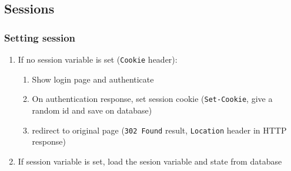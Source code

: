 \documentclass[trans,compress,xcolor=table]{beamer}
\begin{document}
\subsection{Sessions}
\begin{frame}[fragile]
\frametitle{Setting session}
\begin{enumerate}
\item If no session variable is set (\lstinline!Cookie! header):
\begin{enumerate}
	\item Show login page and authenticate
	\item On authentication response, set session cookie
			(\lstinline!Set-Cookie!, give a random id and save on database)
	\item redirect to original page (\lstinline!302 Found! result, \lstinline!Location! header in HTTP response)
\end{enumerate}
\item If session variable is set, load the sesion variable and state
	from database
\end{enumerate}
\end{frame}
\end{document}

